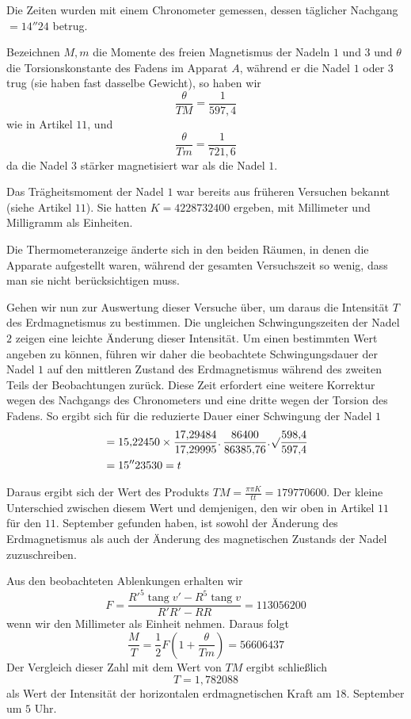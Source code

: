 Die Zeiten wurden mit einem Chronometer gemessen, dessen täglicher Nachgang $=14''24$ betrug.

Bezeichnen $M,m$ die Momente des freien Magnetismus der Nadeln $1$ und $3$ und $\theta$ die Torsionskonstante des Fadens im Apparat $A$, während er die Nadel $1$ oder $3$ trug (sie haben fast dasselbe Gewicht), so haben wir
\[
\frac{\theta}{TM}=\frac1{597{,}4}
\]
wie in Artikel $11$, und
\[
\frac{\theta}{Tm}=\frac1{721{,}6}
\]
da die Nadel $3$ stärker magnetisiert war als die Nadel $1$.
\par
{}
Das Trägheitsmoment der Nadel $1$ war bereits aus früheren Versuchen bekannt (siehe Artikel $11$). Sie hatten $K=4228732400$ ergeben, mit Millimeter und Milligramm als Einheiten.

Die Thermometeranzeige änderte sich in den beiden Räumen, in denen die Apparate aufgestellt waren, während der gesamten Versuchszeit so wenig, dass man sie nicht berücksichtigen muss.

Gehen wir nun zur Auswertung dieser Versuche über, um daraus die Intensität $T$ des Erdmagnetismus zu bestimmen. Die ungleichen Schwingungszeiten der Nadel $2$ zeigen eine leichte Änderung dieser Intensität. Um einen bestimmten Wert angeben zu können, führen wir daher die beobachtete Schwingungsdauer der Nadel $1$ auf den mittleren Zustand des Erdmagnetismus während des zweiten Teils der Beobachtungen zurück. Diese Zeit erfordert eine weitere Korrektur wegen des Nachgangs des Chronometers und eine dritte wegen der Torsion des Fadens. So ergibt sich für die reduzierte Dauer einer Schwingung der Nadel $1$
\[
\begin{aligned}
&=15{,}22450\times\frac{17{,}29484}{17{,}29995}\mathpunct{.}\frac{86400}{86385{,}76}\mathpunct{.}\mathord{{}^{}\!\surd}\frac{598{,}4}{597{,}4}\\
&=15''23530=t
\end{aligned}
\]

Daraus ergibt sich der Wert des Produkts $TM=\frac{\pi\pi K}{tt}=179770600$. Der kleine Unterschied zwischen diesem Wert und demjenigen, den wir oben in Artikel $11$ für den $11$. September gefunden haben, ist sowohl der Änderung des Erdmagnetismus als auch der Änderung des magnetischen Zustands der Nadel zuzuschreiben.

Aus den beobachteten Ablenkungen erhalten wir
\[
F=\frac{R'^5\operatorname{tang}v'-R^5\operatorname{tang}v}{R'R'-RR}=113056200
\]
wenn wir den Millimeter als Einheit nehmen. Daraus folgt
\[
\frac MT=\frac12F\left(1+\frac{\theta}{Tm}\right)=56606437
\]
Der Vergleich dieser Zahl mit dem Wert von $TM$ ergibt schließlich
\[
T=1{,}782088
\]
als Wert der Intensität der horizontalen erdmagnetischen Kraft am $18$. September um $5$ Uhr.

